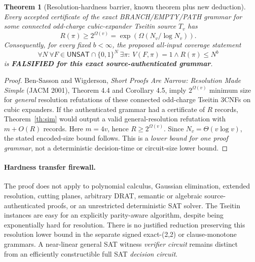 \documentclass[11pt]{article}
\newtheorem{theorem}{Theorem}
\newcommand{\UNSAT}{\mathsf{UNSAT}}
\begin{document}
\begin{theorem}[Resolution-hardness barrier, known theorem plus new deduction]\label{th:barrier}
Every accepted certificate of the exact BRANCH/EMPTY/PATH grammar for some connected odd-charge cubic-expander Tseitin source \(T_v\) has
\[
\boxed{R(\pi)\ge 2^{\Omega(v)}
       =\exp(\Omega(N_v/\log N_v)).}
\]
Consequently, for every fixed \(b<\infty\), the proposed all-input coverage statement
\[
\forall N\ \forall F\in\UNSAT\cap\{0,1\}^N\
\exists \pi:\ V(F,\pi)=1\wedge R(\pi)\le N^b
\]
is \textbf{FALSIFIED for this exact source-authenticated grammar}.
\end{theorem}
\begin{proof}
Ben-Sasson and Wigderson, \emph{Short Proofs Are Narrow: Resolution Made Simple} (JACM 2001), Theorem 4.4 and Corollary 4.5, imply \(2^{\Omega(v)}\) minimum size for \emph{general} resolution refutations of these connected odd-charge Tseitin 3CNFs on cubic expanders. If the authenticated grammar had a certificate of \(R\) records, Theorem~\ref{th:sim} would output a valid general-resolution refutation with \(m+O(R)\) records. Here \(m=4v\), hence \(R\ge 2^{\Omega(v)}\). Since \(N_v=\Theta(v\log v)\), the stated encoded-size bound follows. This is a \emph{lower bound for one proof grammar}, not a deterministic decision-time or circuit-size lower bound.
\end{proof}

\paragraph{Hardness transfer firewall.}
The proof does not apply to polynomial calculus, Gaussian elimination, extended resolution, cutting planes, arbitrary DRAT, semantic or algebraic source-authenticated proofs, or an unrestricted deterministic SAT solver. The Tseitin instances are easy for an explicitly parity-aware algorithm, despite being exponentially hard for resolution. There is no justified reduction preserving this resolution lower bound in the separate signed exact-(2,2) or clause-monotone grammars. A near-linear general SAT witness \emph{verifier circuit} remains distinct from an efficiently constructible full SAT \emph{decision circuit}.
\end{document}
